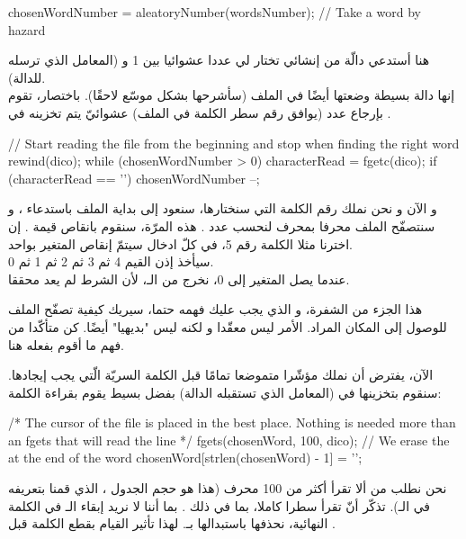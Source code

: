 \begin{Csource}
chosenWordNumber = aleatoryNumber(wordsNumber); // Take a word by hazard
\end{Csource}

هنا أستدعي دالّة من إنشائي تختار لي عددا عشوائيا بين 1 و
(المعامل الذي ترسله للدالة).\\
إنها دالة بسيطة وضعتها أيضًا في الملف
(سأشرحها بشكل موسّع لاحقًا). باختصار، تقوم بإرجاع عدد (يوافق رقم سطر الكلمة في الملف) عشوائيّ يتم تخزينه في
.

\begin{Csource}
// Start reading the file from the beginning and stop when finding the right word
rewind(dico);
while (chosenWordNumber > 0)
{
	characterRead = fgetc(dico);
	if (characterRead == '\n')
    	 chosenWordNumber --;
}
\end{Csource}

و الآن و نحن نملك رقم الكلمة التي سنختارها، سنعود إلى بداية الملف باستدعاء
،
و سنتصفّح الملف محرفا بمحرف لنحسب عدد
.
هذه المرّة، سنقوم بانقاص قيمة
.
إن اخترنا مثلا الكلمة رقم 5، في كلّ ادخال سيتمّ إنقاص المتغير
بواحد.\\
سيأخذ إذن القيم 4 ثم 3 ثم 2 ثم 1 ثم 0. \\
عندما يصل المتغير إلى 0، نخرج من الـ،
لأن الشرط
لم يعد محققا.

هذا الجزء من الشفرة، و الذي يجب عليك فهمه حتما، سيريك كيفية تصفّح الملف للوصول إلى المكان المراد. الأمر ليس معقّدا و لكنه ليس "بديهيا" أيضًا. كن متأكّدا من فهم ما أقوم بفعله هنا.

الآن، يفترض أن نملك مؤشّرا متموضعا تمامًا قبل الكلمة السريّة الّتي يجب إيجادها.
سنقوم بتخزينها في
(المعامل الذي تستقبله الدالة) بفضل
بسيط يقوم بقراءة الكلمة:

\begin{Csource}
/* The cursor of the file is placed in the best place.
Nothing is needed more than an fgets that will read the line */
fgets(chosenWord, 100, dico);
// We erase the \n at the end of the word
chosenWord[strlen(chosenWord) - 1] = '\0';
\end{Csource}

نحن نطلب من
ألا تقرأ أكثر من 100 محرف (هذا هو حجم الجدول
،
الذي قمنا بتعريفه في الـ).
تذكّر أنّ
تقرأ سطرا كاملا، بما في ذلك
.
بما أننا لا نريد إبقاء الـ
في الكلمة النهائية، نحذفها باستبدالها بـ.
لهذا تأثير القيام بقطع الكلمة قبل
.

